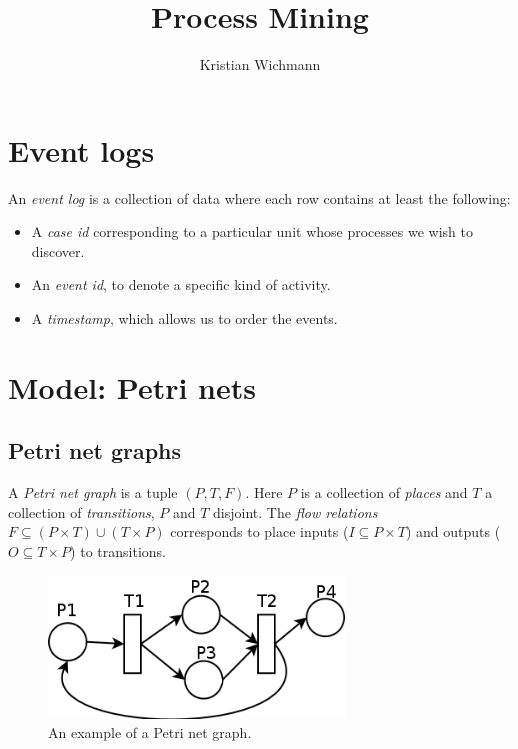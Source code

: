 \documentclass[12pt, a4paper]{article}
\title{Process Mining}
\author{Kristian Wichmann}
\numberwithin{equation}{section}
\begin{document}
\maketitle

\section{Event logs}
An \textit{event log} is a collection of data where each row contains at least the following:
\begin{itemize}
\item A \textit{case id} corresponding to a particular unit whose processes we wish to discover.
\item An \textit{event id}, to denote a specific kind of activity.
\item A \textit{timestamp}, which allows us to order the events.
\end{itemize}

\section{Model: Petri nets}

\subsection{Petri net graphs}
A \textit{Petri net graph} is a tuple $(P, T, F)$. Here $P$ is a collection of \textit{places} and $T$ a collection of \textit{transitions}, $P$ and $T$ disjoint. The \textit{flow relations} $F\subseteq(P\times T)\cup(T\times P)$ corresponds to place inputs ($I\subseteq P\times T$) and outputs ($O\subseteq T\times P$) to transitions.

\begin{figure}
\centering
\includegraphics[width=0.7\textwidth]{petri_graph}
\caption{An example of a Petri net graph.}
\label{fig:petri_graph}
\end{figure}
\end{document}
